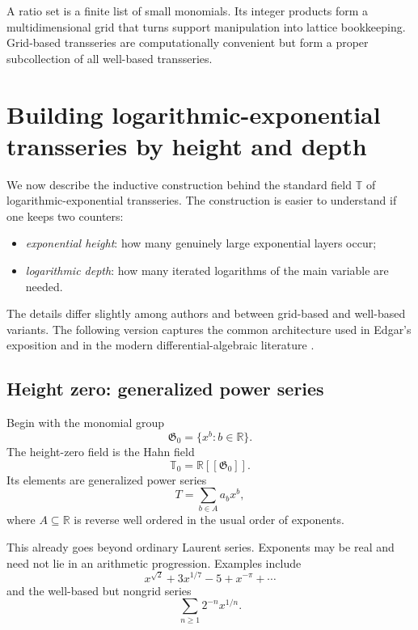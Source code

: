 \documentclass[11pt,openany]{book}
\theoremstyle{definition}
\theoremstyle{plain}
\theoremstyle{remark}
\newcommand{\R}{\mathbb{R}}
\newcommand{\T}{\mathbb{T}}
\newcommand{\G}{\mathfrak{G}}
\begin{document}
\begin{summarybox}
A ratio set is a finite list of small monomials. Its integer products form a multidimensional grid that turns support manipulation into lattice bookkeeping. Grid-based transseries are computationally convenient but form a proper subcollection of all well-based transseries.
\end{summarybox}

\chapter{Building logarithmic-exponential transseries by height and depth}\label{ch:construction}

We now describe the inductive construction behind the standard field $\T$ of logarithmic-exponential transseries. The construction is easier to understand if one keeps two counters:

\begin{itemize}
\item \emph{exponential height}: how many genuinely large exponential layers occur;
\item \emph{logarithmic depth}: how many iterated logarithms of the main variable are needed.
\end{itemize}

The details differ slightly among authors and between grid-based and well-based variants. The following version captures the common architecture used in Edgar's exposition and in the modern differential-algebraic literature \cite{edgar-beginners,vdhoeven-book,adh-book}.

\section{Height zero: generalized power series}

Begin with the monomial group
\[
 \G_0=\{x^b:b\in\R\}.
\]
The height-zero field is the Hahn field
\begin{equation}\label{eq:T0}
 \T_0=\R[[\G_0]].
\end{equation}
Its elements are generalized power series
\[
 T=\sum_{b\in A}a_bx^b,
\]
where $A\subseteq\R$ is reverse well ordered in the usual order of exponents.

This already goes beyond ordinary Laurent series. Exponents may be real and need not lie in an arithmetic progression. Examples include
\[
 x^{\sqrt2}+3x^{1/7}-5+x^{-\pi}+\cdots
\]
and the well-based but nongrid series
\[
 \sum_{n\ge1}2^{-n}x^{1/n}.
\]
\end{document}
